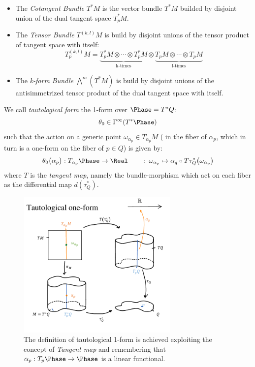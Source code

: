 \documentclass[a4paper,10pt,smallheadings]{scrartcl}
\begin{document}
				\begin{itemize}
				\item The \emph{Cotangent Bundle} $T^*M$ is  the vector bundle $T^*M$ builded by disjoint union of the dual tangent space $T_p^*M $.
					\item The \emph{Tensor Bundle} $T^{(k,l)}M$ is build by disjoint unions of the tensor product of tangent space with itself:
					\begin{displaymath}
						T^{(k,l)}_ p M = \underbrace{T^*_pM \otimes \cdots \otimes T^*_pM}_{\textrm{k-times}} \otimes
						\underbrace{T_pM \otimes \cdots \otimes T_pM}_{\textrm{l-times}}
					\end{displaymath}
					\item The \emph{k-form Bundle} $ \bigwedge^m( T^*M)$ is build by disjoint unions of the antisimmetrized tensor product of the dual tangent space with itself.
				\end{itemize}

				\begin{definition}
						We call \emph{tautological form} the 1-form over $\Phase= T^*Q$:
						\begin{displaymath}
							\theta_0 \in \Gamma^\infty (T^*\Phase)
						\end{displaymath}
					such that the action on a generic point $ \omega_{\alpha_p} \in T_{\alpha_p}M$ ( in the fiber of $\alpha_p$, which in turn is a one-form on the fiber of $p\in Q$) is given by:
						\begin{displaymath}
						\theta_0 \big(\alpha_p \big): T_{\alpha_p}\Phase \rightarrow \Real \qquad : \; \omega_{\alpha_p} \mapsto \alpha_q \circ T \tau^*_Q \big( \omega_{\alpha_p} \big)
						\end{displaymath}
					where $T$ is the \emph{tangent map}, namely the bundle-morphism which act on each fiber as the differential map $d (\tau^*_Q)$.
					\end{definition}

					\begin{figure}[h!]
					  	\centering
   						\includegraphics[width=0.7\textwidth]{../Pictures/Tautological1Form}
 						\caption{The definition of tautological 1-form is achieved exploiting the concept of \emph{Tangent map} and remembering that $\alpha_p: T_p \Phase \rightarrow \Phase$ is a linear functional.}
					\end{figure}
\end{document}
